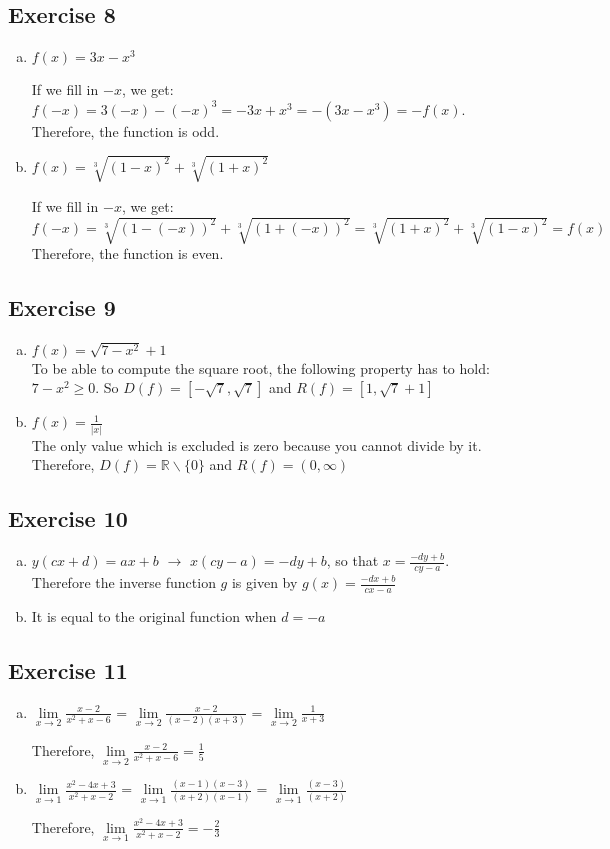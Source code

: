 \documentclass[a4paper]{article}
\newcommand{\exerciseenum}[2]{\subsection*{Exercise #1}{\begin{enumerate}[a)]#2\end{enumerate}}}
\begin{document}
\exerciseenum{8}{%
\item%
$f(x) = 3x - x^3$

If we fill in $-x$, we get:\\
$f(-x) = 3(-x) - (-x)^3 = -3x + x^3 = -(3x - x^3) = -f(x)$.\\
Therefore, the function is odd. 
\item%
$f(x) = \sqrt[3]{(1-x)^2} + \sqrt[3]{(1+x)^2}$ 

If we fill in $-x$, we get:\\
$f(-x) = \sqrt[3]{(1- (-x))^2} + \sqrt[3]{(1+(-x))^2} = \sqrt[3]{(1+x)^2} + \sqrt[3]{(1-x)^2} = f(x)$\\
Therefore, the function is even. 
}

\exerciseenum{9}{%
\item%
$f(x) = \sqrt{7-x^2} + 1$\\
To be able to compute the square root, the following property has to hold: $7 - x^2 \geq 0$. So $D(f) = [-\sqrt{7}, \sqrt{7}]$ and $R(f) = [1, \sqrt{7} + 1]$
\item%
$f(x) = \frac{1}{|x|}$\\
The only value which is excluded is zero because you cannot divide by it. Therefore, $D(f) = \mathbb{R} \backslash \{ 0\}$ and $R(f) = (0, \infty)$
}

\exerciseenum{10}{%
\item%
$y(cx + d) = ax + b$ $\rightarrow$ $x(cy - a) = -dy + b$, so that $x = \frac{-dy + b}{cy - a}$. Therefore the inverse function $g$ is given by $g(x) = \frac{-dx + b}{cx - a}$
\item%
It is equal to the original function when $d = -a$
}

\exerciseenum{11}{%
\item%
$\lim\limits_{x\to 2} \frac{x-2}{x^2+x-6}$ = 
$\lim\limits_{x\to 2} \frac{x-2}{(x-2)(x+3)}$ =
$\lim\limits_{x\to 2} \frac{1}{x+3}$

Therefore, $\lim\limits_{x\to 2} \frac{x-2}{x^2+x-6} = \frac{1}{5}$    
  
\item%
$\lim\limits_{x\to 1} \frac{x^2-4x+3}{x^2+x-2}$ =
$\lim\limits_{x\to 1} \frac{(x-1)(x-3)}{(x+2)(x-1)}$ = 
$\lim\limits_{x\to 1} \frac{(x-3)}{(x+2)}$

Therefore, $\lim\limits_{x\to 1} \frac{x^2-4x+3}{x^2+x-2} = -\frac{2}{3}$
}
\end{document}
